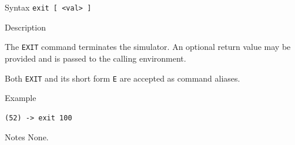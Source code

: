 %
%
\pagebreak
{}

\begin{iPageDescEntry}{Syntax}
\texttt{exit [ <val> ]} \\
\end{iPageDescEntry}

\begin{iPageDescEntry}{Description}

The \texttt{EXIT} command terminates the simulator. An optional return value may be provided and is passed to the calling environment.

Both \texttt{EXIT} and its short form \texttt{E} are accepted as command aliases.

\end{iPageDescEntry}

\begin{iPageDescOpEntry}{Example}

\begin{lstlisting}[style=iPageOpStyle]
(52) -> exit 100
\end{lstlisting}

\end{iPageDescOpEntry}

\begin{iPageDescEntry}{Notes}
None.
\end{iPageDescEntry}
